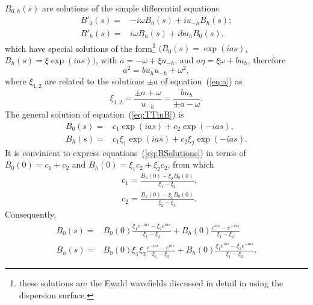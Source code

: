 \documentclass[preprint]{iucr}              %
\begin{document}
$B_{0,h}(s)$ are solutions of the simple differential equations
\begin{subequations}
\label{eq:TTinB}
\begin{align}
B'_0(s) =& -i \omega B_0(s) + i u_{-h} B_h(s); \\
B'_h(s) =& i \omega B_h(s) + i b u_{h} B_0(s).
\end{align}
\end{subequations}
which have special solutions of the form\footnote{these solutions are the Ewald wavefields discussed in detail in \cite{authierbook} using the dispersion surface.} $(B_0(s)=\exp(i a s)$, $B_h(s)=\xi \exp(i a s))$, with $a =-\omega + \xi u_{-h}$, and $a \eta=\xi \omega+b u_h$, therefore
\begin{equation}\label{eq:a}
    a^2=b u_h u_{-h}+\omega^2,
\end{equation}
where $\xi_{1,2}$ are related to the solutions $\pm a$ of equation~(\ref{eq:a}) as 
\begin{equation}\label{eq:xis}
\xi_{1,2}= \frac{\pm a + \omega }{u_{-h}}=\frac{b u_h}{\pm a-\omega}.    
\end{equation}
The general solution of equation~(\ref{eq:TTinB}) is
\begin{subequations}
\label{eq:BSolutions}
\begin{align}
B_0(s) = &c_1 \exp(i a s) + c_2 \exp(-i a s), \\
B_h(s) = &c_1 \xi_1 \exp(i a s) + c_2 \xi_2 \exp(-i a s).
\end{align}
\end{subequations}
It is convinient to express equations~(\ref{eq:BSolutions}) in terms of $B_0(0)=c_1+c_2$ and $B_h(0)=\xi_1 c_2+\xi_2 c_2$, from which 
\begin{subequations}
\label{eq:cs}
\begin{align}
&c_1=\frac{B_h(0)-\xi_2 B_0(0)}{\xi_1-\xi_2}, \nonumber \\
&c_2=\frac{B_h(0)-\xi_1 B_0(0)}{\xi_2-\xi_1}. \nonumber
\end{align}
\end{subequations}
Consequently, 
\begin{subequations}
\label{eq:preBSolutions}
\begin{align}
B_0(s) = &B_0(0) \frac{\xi_1 e^{-ias} - \xi_2 e^{ias}}{\xi_1-\xi_2} + 
    B_h(0) \frac{e^{ias} - e^{-ias}}{\xi_1-\xi_2} \\
B_h(s) = &B_0(0) \xi_1\xi_2 \frac{e^{-ias} - e^{ias}}{\xi_1-\xi_2} + 
    B_h(0) \frac{\xi_1 e^{ias} - \xi_2 e^{-ias}}{\xi_1-\xi_2}.
\end{align}
\end{subequations}
\end{document}
